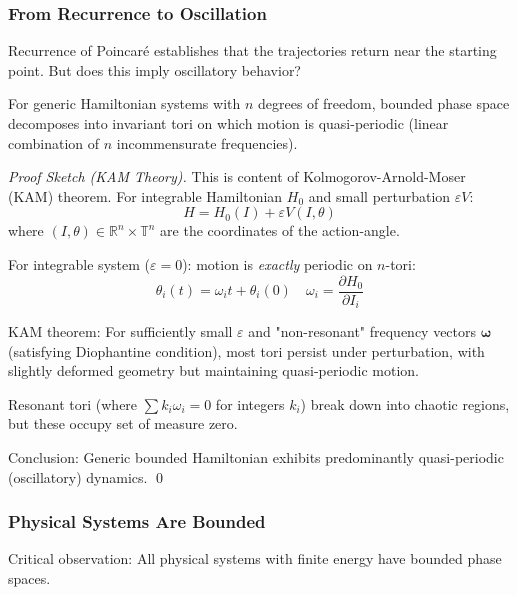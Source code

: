 \documentclass[11pt,onecolumn]{article}
\begin{document}
\subsubsection{From Recurrence to Oscillation}

Recurrence of Poincar\'e establishes that the trajectories return near the starting point. But does this imply oscillatory behavior?

\begin{proposition}
For generic Hamiltonian systems with $n$ degrees of freedom, bounded phase space decomposes into invariant tori on which motion is quasi-periodic (linear combination of $n$ incommensurate frequencies).
\end{proposition}

\begin{proof}[Proof Sketch (KAM Theory)]
This is content of Kolmogorov-Arnold-Moser (KAM) theorem. For integrable Hamiltonian $H_0$ and small perturbation $\varepsilon V$:
\begin{equation}
H = H_0(I) + \varepsilon V(I, \theta)
\end{equation}
where $(I, \theta) \in \mathbb{R}^n \times \mathbb{T}^n$ are the coordinates of the action-angle.

For integrable system ($\varepsilon = 0$): motion is \textit{exactly} periodic on $n$-tori:
\begin{equation}
\theta_i(t) = \omega_i t + \theta_i(0) \quad \omega_i = \frac{\partial H_0}{\partial I_i}
\end{equation}

KAM theorem: For sufficiently small $\varepsilon$ and "non-resonant" frequency vectors $\boldsymbol{\omega}$ (satisfying Diophantine condition), most tori persist under perturbation, with slightly deformed geometry but maintaining quasi-periodic motion.

Resonant tori (where $\sum k_i \omega_i = 0$ for integers $k_i$) break down into chaotic regions, but these occupy set of measure zero.

Conclusion: Generic bounded Hamiltonian exhibits predominantly quasi-periodic (oscillatory) dynamics. \qed
\end{proof}

\subsubsection{Physical Systems Are Bounded}

Critical observation: All physical systems with finite energy have bounded phase spaces.
\end{document}
